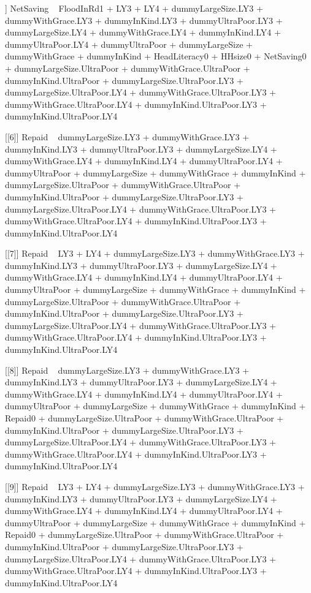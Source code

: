 \begin{Schunk}
\begin{Soutput}
[[5]]
NetSaving ~ FloodInRd1 + LY3 + LY4 + dummyLargeSize.LY3 + dummyWithGrace.LY3 + 
    dummyInKind.LY3 + dummyUltraPoor.LY3 + dummyLargeSize.LY4 + 
    dummyWithGrace.LY4 + dummyInKind.LY4 + dummyUltraPoor.LY4 + 
    dummyUltraPoor + dummyLargeSize + dummyWithGrace + dummyInKind + 
    HeadLiteracy0 + HHsize0 + NetSaving0 + dummyLargeSize.UltraPoor + 
    dummyWithGrace.UltraPoor + dummyInKind.UltraPoor + dummyLargeSize.UltraPoor.LY3 + 
    dummyLargeSize.UltraPoor.LY4 + dummyWithGrace.UltraPoor.LY3 + 
    dummyWithGrace.UltraPoor.LY4 + dummyInKind.UltraPoor.LY3 + 
    dummyInKind.UltraPoor.LY4

[[6]]
Repaid ~ dummyLargeSize.LY3 + dummyWithGrace.LY3 + dummyInKind.LY3 + 
    dummyUltraPoor.LY3 + dummyLargeSize.LY4 + dummyWithGrace.LY4 + 
    dummyInKind.LY4 + dummyUltraPoor.LY4 + dummyUltraPoor + dummyLargeSize + 
    dummyWithGrace + dummyInKind + dummyLargeSize.UltraPoor + 
    dummyWithGrace.UltraPoor + dummyInKind.UltraPoor + dummyLargeSize.UltraPoor.LY3 + 
    dummyLargeSize.UltraPoor.LY4 + dummyWithGrace.UltraPoor.LY3 + 
    dummyWithGrace.UltraPoor.LY4 + dummyInKind.UltraPoor.LY3 + 
    dummyInKind.UltraPoor.LY4

[[7]]
Repaid ~ LY3 + LY4 + dummyLargeSize.LY3 + dummyWithGrace.LY3 + 
    dummyInKind.LY3 + dummyUltraPoor.LY3 + dummyLargeSize.LY4 + 
    dummyWithGrace.LY4 + dummyInKind.LY4 + dummyUltraPoor.LY4 + 
    dummyUltraPoor + dummyLargeSize + dummyWithGrace + dummyInKind + 
    dummyLargeSize.UltraPoor + dummyWithGrace.UltraPoor + dummyInKind.UltraPoor + 
    dummyLargeSize.UltraPoor.LY3 + dummyLargeSize.UltraPoor.LY4 + 
    dummyWithGrace.UltraPoor.LY3 + dummyWithGrace.UltraPoor.LY4 + 
    dummyInKind.UltraPoor.LY3 + dummyInKind.UltraPoor.LY4

[[8]]
Repaid ~ dummyLargeSize.LY3 + dummyWithGrace.LY3 + dummyInKind.LY3 + 
    dummyUltraPoor.LY3 + dummyLargeSize.LY4 + dummyWithGrace.LY4 + 
    dummyInKind.LY4 + dummyUltraPoor.LY4 + dummyUltraPoor + dummyLargeSize + 
    dummyWithGrace + dummyInKind + Repaid0 + dummyLargeSize.UltraPoor + 
    dummyWithGrace.UltraPoor + dummyInKind.UltraPoor + dummyLargeSize.UltraPoor.LY3 + 
    dummyLargeSize.UltraPoor.LY4 + dummyWithGrace.UltraPoor.LY3 + 
    dummyWithGrace.UltraPoor.LY4 + dummyInKind.UltraPoor.LY3 + 
    dummyInKind.UltraPoor.LY4

[[9]]
Repaid ~ LY3 + LY4 + dummyLargeSize.LY3 + dummyWithGrace.LY3 + 
    dummyInKind.LY3 + dummyUltraPoor.LY3 + dummyLargeSize.LY4 + 
    dummyWithGrace.LY4 + dummyInKind.LY4 + dummyUltraPoor.LY4 + 
    dummyUltraPoor + dummyLargeSize + dummyWithGrace + dummyInKind + 
    Repaid0 + dummyLargeSize.UltraPoor + dummyWithGrace.UltraPoor + 
    dummyInKind.UltraPoor + dummyLargeSize.UltraPoor.LY3 + dummyLargeSize.UltraPoor.LY4 + 
    dummyWithGrace.UltraPoor.LY3 + dummyWithGrace.UltraPoor.LY4 + 
    dummyInKind.UltraPoor.LY3 + dummyInKind.UltraPoor.LY4


\end{Soutput}
\end{Schunk}
